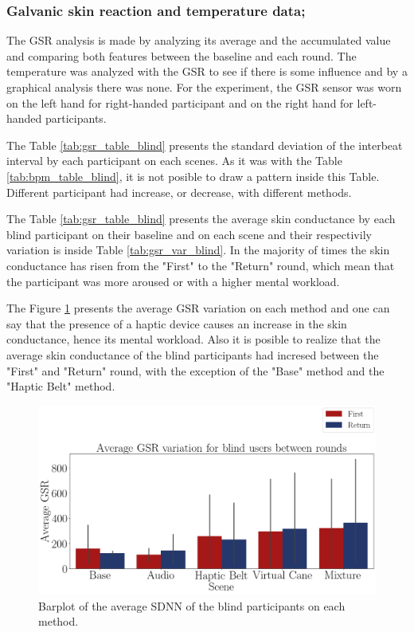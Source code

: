 \subsubsection{Galvanic skin reaction and temperature data;}
\label{subsubsec:results_gsr_temp_2}

The GSR analysis is made by analyzing its average and the accumulated value and comparing both features between the baseline and each round. The temperature was analyzed with the GSR to see if there is some influence and by a graphical analysis there was none. For the experiment, the GSR sensor was worn on the left hand for right-handed participant and on the right hand for left-handed participants.

The Table \ref{tab:gsr_table_blind} presents the standard deviation of the interbeat interval by each participant on each scenes. As it was with the Table \ref{tab:bpm_table_blind}, it is not posible to draw a pattern inside this Table. Different participant had increase, or decrease, with different methods.


The Table \ref{tab:gsr_table_blind} presents the average skin conductance by each blind participant on their baseline and on each scene and their respectivily variation is inside Table \ref{tab:gsr_var_blind}. In the majority of times the skin conductance has risen from the "First" to the "Return" round, which mean that the participant was more aroused or with a higher mental workload.





The Figure \ref{fig:barplot_gsr_avg_5_scene_blind} presents the average GSR variation on each method and one can say that the presence of a haptic device causes an increase in the skin conductance, hence its mental workload. Also it is posible to realize that the average skin conductance of the blind participants had incresed between the "First" and "Return" round, with the exception of the "Base" method and the "Haptic Belt" method.

\begin{figure}[!htb]
    \centering
    \includegraphics[width = 0.8\linewidth]{Resultados/GSR/Figuras/png/barplot_gsr_avg_5_scene_blind.png}
    \caption{Barplot of the average SDNN of the blind participants on each method.}
    \label{fig:barplot_gsr_avg_5_scene_blind}
\end{figure}

